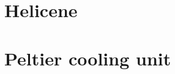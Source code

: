 \documentclass[
twoside,				%
BCOR=8mm,				%
headings=normal,		%
headsepline,			%
footsepline,			%
plainfootsepline,		%
]{scrbook}
\begin{document}
 \section{Helicene}
  
\section{Peltier cooling unit}
 

\printbibliography
\end{document}
